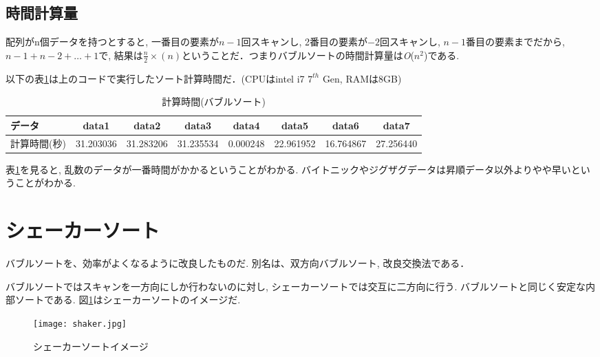 \documentclass[a4j, titlepage]{jarticle}
\begin{document}
\subsection{時間計算量}
配列がn個データを持つとすると, 一番目の要素が$n-1$回スキャンし, 2番目の要素が$-2$回スキャンし, $n-1$番目の要素までだから, $n-1 + n-2 + \dots + 1$で, 
結果は$\frac{n}{2}\times(n)$ということだ．つまりバブルソートの時間計算量は\textit{O}($n^2$)である.

以下の表\ref{table:bubble}は上のコードで実行したソート計算時間だ．(CPUはintel i7 $7^{th}$ Gen, RAMは8GB)
\begin{table}[bth]
\label{table:bubble}
\caption{計算時間(バブルソート)}
\begin{center}
\begin{tabular}{|l|ccccccc|}
\hline
データ & data1 & data2 &data3 &data4 &data5 &data6 &data7 \\ \hline
計算時間(秒) & 31.203036 & \cellcolor{red!20}31.283206 & 31.235534 & \cellcolor{green!20}0.000248 &  22.961952 & 16.764867 & 27.256440\\ \hline
\end{tabular}
\end{center}
\end{table}
表\ref{table:bubble}を見ると, 乱数のデータが一番時間がかかるということがわかる. バイトニックやジグザグデータは昇順データ以外よりやや早いということがわかる.

\section{シェーカーソート}
バブルソートを、効率がよくなるように改良したものだ. 別名は、双方向バブルソート, 改良交換法である．

バブルソートではスキャンを一方向にしか行わないのに対し, シェーカーソートでは交互に二方向に行う. バブルソートと同じく安定な内部ソートである. 図\ref{shaker}はシェーカーソートのイメージだ.

\begin{figure}[tbh]
\centering \texttt{[image: shaker.jpg]}
\caption{シェーカーソートイメージ}
\label{shaker}
\end{figure}
\end{document}
